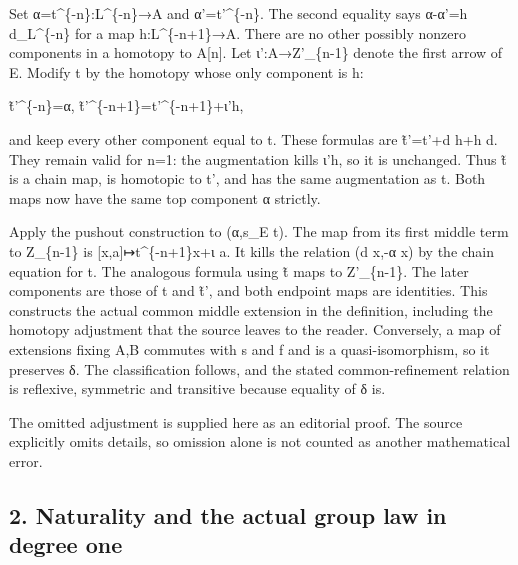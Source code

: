 \documentclass[11pt]{article}
\begin{document}
Set α\allowbreak{}=t\textasciicircum{}\{-n\}:\allowbreak{}L\textasciicircum{}\{-n\}\allowbreak{}→A and α'\allowbreak{}=t'\textasciicircum{}\{-n\}. The second equality says α-α'\allowbreak{}=h d\_\allowbreak{}L\textasciicircum{}\{-n\} for a map h:\allowbreak{}L\textasciicircum{}\{-n\allowbreak{}+1\}\allowbreak{}→A. There are no other possibly nonzero components in a homotopy to A[n]\allowbreak{}. Let ι':\allowbreak{}A\allowbreak{}→Z'\_\allowbreak{}\{n-1\} denote the first arrow of E\textquotesingle. Modify t\textquotesingle{} by the homotopy whose only component is h:\allowbreak{}

t̃'\textasciicircum{}\{-n\}\allowbreak{}=α,\allowbreak{} t̃'\textasciicircum{}\{-n\allowbreak{}+1\}\allowbreak{}=t'\textasciicircum{}\{-n\allowbreak{}+1\}\allowbreak{}+ι'h,\allowbreak{}

and keep every other component equal to t\textquotesingle. These formulas are t̃'\allowbreak{}=t'\allowbreak{}+d h\allowbreak{}+h d. They remain valid for n\allowbreak{}=1:\allowbreak{} the augmentation kills ι'h,\allowbreak{} so it is unchanged. Thus t̃\textquotesingle{} is a chain map,\allowbreak{} is homotopic to t',\allowbreak{} and has the same augmentation as t. Both maps now have the same top component α strictly.

Apply the pushout construction to (α,\allowbreak{}s\_\allowbreak{}E t)\allowbreak{}. The map from its first middle term to Z\_\allowbreak{}\{n-1\} is [x,\allowbreak{}a]\allowbreak{}\allowbreak{}↦t\textasciicircum{}\{-n\allowbreak{}+1\}x\allowbreak{}+ι a. It kills the relation (d x,\allowbreak{}-α x)\allowbreak{} by the chain equation for t. The analogous formula using t̃\textquotesingle{} maps to Z'\_\allowbreak{}\{n-1\}. The later components are those of t and t̃',\allowbreak{} and both endpoint maps are identities. This constructs the actual common middle extension in the definition,\allowbreak{} including the homotopy adjustment that the source leaves to the reader. Conversely,\allowbreak{} a map of extensions fixing A,\allowbreak{}B commutes with s and f and is a quasi-isomorphism,\allowbreak{} so it preserves δ. The classification follows,\allowbreak{} and the stated common-refinement relation is reflexive,\allowbreak{} symmetric and transitive because equality of δ is.

The omitted adjustment is supplied here as an editorial proof. The source explicitly omits details,\allowbreak{} so omission alone is not counted as another mathematical error.

\subsection{2. Naturality and the actual group law in degree one}\label{proofs-8774-9196-naturality-and-the-actual-group-law-in-degree-one}
\end{document}
